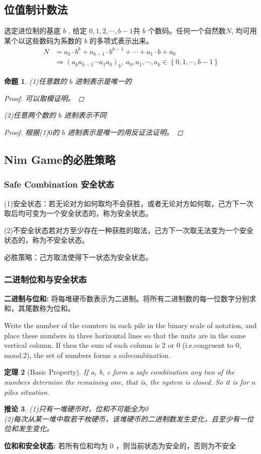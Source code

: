 \documentclass[10t, a4paper, oneside]{ctexbook}
\newtheorem{theorem}{定理}[section]
\newtheorem{corollary}[theorem]{推论}
\newtheorem{proposition}[theorem]{命题}
\begin{document}
\subsection{位值制计数法}
选定进位制的基底 $b$ , 给定 $0,1,2,\cdots,b-1$共 $b$ 个数码。任何一个自然数$N$, 均可用某个以这些数码为系数的 $b$ 的多项式表示出来。
$$
\begin{aligned}N&=a_k\cdot b^k+a_{k-1}\cdot b^{k-1}+\cdots+a_1\cdot b+a_0\\&\Rightarrow\left(a_ka_{k-1}\cdots a_1a_0\right)_b,\:a_0,a_1,\cdots,a_k\in\left\{0,1,\cdots,b-1\right\}\end{aligned}
$$
\begin{proposition}
(1)任意数的 $b$ 进制表示是唯一的
\begin{proof}
    可以取模证明。 
\end{proof} 
(2)任意两个数的 $b$ 进制表示不同 
\begin{proof}
    根据(1)$0$的 $b$ 进制表示是唯一的用反证法证明。
\end{proof}
\end{proposition}
\subsection{Nim Game的必胜策略}
\subsubsection{Safe Combination 安全状态}
(1)安全状态：若无论对方如何取均不会获胜，或者无论对方如何取，己方下一次取后均可变为一个安全状态的，称为安全状态。

(2)不安全状态若对方至少存在一种获胜的取法，己方下一次取无法变为一个安全状态的，称为不安全状态。

必胜策略：己方取法使得下一状态为安全状态。
\subsubsection{二进制位和与安全状态}
\noindent\textbf{二进制与位和:}
将每堆硬币数表示为二进制。将所有二进制数的每一位数字分别求和，其尾数称为位和。

Write the number of the counters in each pile in the binary scale of notation,  and place these numbers in three horizontal lines so that the units are in the same vertical column. If then the sum of each column is 2 or 0 (i.e.congruent to 0, mood.2), the set of numbers forms a safecombination. 
\begin{theorem}[Basic Property]
    If a, b, c form a safe combination any two of the numbers determine the remaining one, that is, the system is closed.
    So it is for $n$ piles situation.
\end{theorem}
\begin{corollary}
    (1)只有一堆硬币时，位和不可能全为0\\
    (2)每次从某一堆中取若干枚硬币，该堆硬币的二进制数发生变化，且至少有一位位和发生变化。\\
\end{corollary} 
\noindent\textbf{位和和安全状态:}   
若所有位和均为 0 ，则当前状态为安全的，否则为不安全
\end{document}
